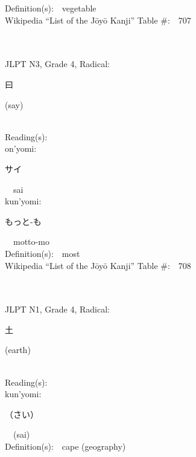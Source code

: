 \begin{multicols}{2}
Definition(s):\ \ vegetable \\
Wikipedia ``List of the J\=oy\=o Kanji'' Table \#:\ \ 707 \\
\ \ \\
{\fontsize{34pt}{40pt}  }\ \ \\  %
{JLPT N3, Grade 4, Radical:\ \ {\begin{CJK}{UTF8}{min} 曰 \end{CJK}} (say) } \\
Reading(s):\ \ \\
{\hspace*{1em}}on'yomi:\ \ \\
{\hspace*{2em}}{\begin{CJK}{UTF8}{min} サイ \end{CJK}}\ \ sai\ \ \\
{\hspace*{1em}}kun'yomi:\ \ \\
{\hspace*{2em}}{\begin{CJK}{UTF8}{min} もっと-も \end{CJK}}\ \ motto-mo\ \ \\
Definition(s):\ \ most \\
Wikipedia ``List of the J\=oy\=o Kanji'' Table \#:\ \ 708 \\
\ \ \\
{\fontsize{34pt}{40pt}  }\ \ \\  %
{JLPT N1, Grade 4, Radical:\ \ {\begin{CJK}{UTF8}{min} 土 \end{CJK}} (earth) } \\
Reading(s):\ \ \\
{\hspace*{1em}}kun'yomi:\ \ \\
{\hspace*{2em}}{\begin{CJK}{UTF8}{min} （さい） \end{CJK}}\ \ (sai)\ \ \\
Definition(s):\ \ cape (geography) \\

\end{multicols}
